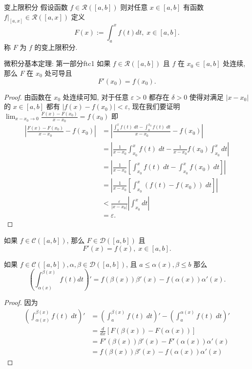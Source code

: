 \documentclass[cn,toc=twocol]{elegantbook}
\newcommand{\D}{\mathscr{D}}
\newcommand{\ds}{\displaystyle}
\begin{document}
\begin{definition}{变上限积分}
	假设函数 $f \in \mathscr{R}([a,b])$ 则对任意 $x\in[a,b]$ 有函数 $f|_{[a,x]} \in \mathscr{R}([a,x])$ 定义
	\[
		F(x) := \int_a^x f(t) dt,\; x\in[a,b].
	\]
	称 $F$ 为 $f$ 的变上限积分.
\end{definition}

\begin{theorem}{微积分基本定理: 第一部分}{ftc1}
	如果 $f \in \mathscr{R}([a,b])$ 且 $f$ 在 $x_0\in[a,b]$ 处连续, 那么 $F$ 在 $x_0$ 处可导且
	\[
		F'(x_0) = f(x_0).
	\]
\end{theorem}
\begin{proof}
	由函数在 $x_0$ 处连续可知, 对于任意 $\varepsilon > 0$ 都存在 $\delta > 0$ 使得对满足 $\lvert x - x_0 \rvert$ 的 $x \in [a,b]$ 都有 $\lvert f(x) - f(x_0) \rvert < \varepsilon$, 现在我们要证明 $\ds \lim_{x - x_0 \to 0}\frac{F(x) - F(x_0)}{x - x_0} = f(x_0)$ 即
	\[
		\begin{aligned}
			\left\lvert \frac{F(x) - F(x_0)}{x - x_0} - f(x_0) \right\rvert &= \left\lvert \frac{\int_a^x f(t)\;dt - \int_a^{x_0} f(t)\;dt}{x - x_0} - f(x_0) \right\rvert\\
			&= \left\lvert \frac{1}{x - x_0}\int_{x_0}^x f(t)\;dt - \frac{1}{x - x_0}f(x_0)\int_{x_0}^x dt \right\rvert\\
			&= \left\lvert \frac{1}{x - x_0}\left[\int_{x_0}^x f(t)\;dt - \int_{x_0}^x f(x_0)\;dt\right] \right\rvert\\
			&= \left\lvert \frac{1}{x - x_0}\left[\int_{x_0}^x (f(t) - f(x_0))\;dt\right] \right\rvert\\
			&< \frac{\varepsilon}{\lvert x - x_0 \rvert} \left\lvert \int_{x_0}^x dt \right\rvert\\
			&= \varepsilon.
		\end{aligned}
	\]
\end{proof}


\begin{corollary}
	如果 $f \in \mathscr{C}([a,b])$, 那么 $F\in\D([a,b])$ 且
	\[
		F'(x) = f(x),\; x \in [a,b].
	\]
\end{corollary}


\begin{corollary}
	如果 $f \in \mathscr{C}([a,b]), \alpha,\beta \in \D([a,b])$, 且 $a \le \alpha(x), \beta \le b$ 那么
	\[
		\left( \int_{\alpha(x)}^{\beta(x)}\;f(t) dt \right)' = f(\beta(x)) \beta'(x) - f(\alpha(x))\alpha'(x).
	\] 
\end{corollary}

\begin{proof}
	因为
	\[
	\begin{aligned}
		\left( \int_{\alpha(x)}^{\beta(x)} f(t)\;dt \right)' &= \left( \int_{a}^{\beta(x)} f(t)\;dt \right)' - \left( \int_{a}^{\alpha(x)} f(t)\;dt \right)'\\
		&= \frac{d}{dx} [F(\beta(x)) - F(\alpha(x))]\\
		&= F'(\beta(x)) \beta'(x) - F'(\alpha(x)) \alpha'(x)\\
		&= f(\beta(x)) \beta'(x) - f(\alpha(x)) \alpha'(x)
	\end{aligned}
	\]
\end{proof}
\end{document}
